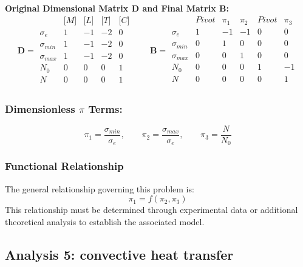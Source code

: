 \textbf{Original Dimensional Matrix $\mathbf{D}$ and Final Matrix $\mathbf{B}$:}
\begin{equation}\mathbf{D} = \begin{array}{r|rrrr}
& \text{[}M\text{]} & \text{[}L\text{]} & \text{[}T\text{]} & \text{[}C\text{]} \\
\hline
\sigma_e & 1 & -1 & -2 & 0 \\
\sigma_{min} & 1 & -1 & -2 & 0 \\
\sigma_{max} & 1 & -1 & -2 & 0 \\
N_0 & 0 & 0 & 0 & 1 \\
N & 0 & 0 & 0 & 1 \\
\end{array}
\qquad
\mathbf{B} = \begin{array}{r|rrrrr}
& Pivot & \pi_{1} & \pi_{2} & Pivot & \pi_{3} \\
\hline
\sigma_e & 1 & -1 & -1 & 0 & 0 \\
\sigma_{min} & 0 & 1 & 0 & 0 & 0 \\
\sigma_{max} & 0 & 0 & 1 & 0 & 0 \\
N_0 & 0 & 0 & 0 & 1 & -1 \\
N & 0 & 0 & 0 & 0 & 1 \\
\end{array}\end{equation}

\subsubsection*{Dimensionless $\pi$ Terms:}
\begin{equation}
\pi_{1} = \frac{\sigma_{min}}{\sigma_e}, \qquad
\pi_{2} = \frac{\sigma_{max}}{\sigma_e}, \qquad
\pi_{3} = \frac{N}{N_0}
\end{equation}

\subsubsection*{Functional Relationship}
The general relationship governing this problem is:
\begin{equation}
\pi_1 = f(\pi_2,\pi_3)
\end{equation}
This relationship must be determined through experimental data or additional theoretical analysis to establish the associated model.

\subsection{Analysis 5: convective heat transfer}
\label{sec:Convective_Heat_Transfer}

